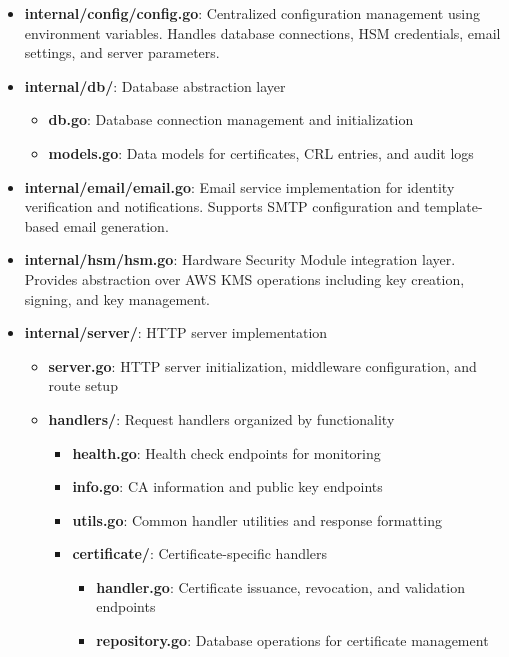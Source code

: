 \begin{itemize}
    \item \textbf{internal/config/config.go}: Centralized configuration management using environment variables. Handles database connections, HSM credentials, email settings, and server parameters.
    
    \item \textbf{internal/db/}: Database abstraction layer
    \begin{itemize}
        \item \textbf{db.go}: Database connection management and initialization
        \item \textbf{models.go}: Data models for certificates, CRL entries, and audit logs
    \end{itemize}
    
    \item \textbf{internal/email/email.go}: Email service implementation for identity verification and notifications. Supports SMTP configuration and template-based email generation.
    
    \item \textbf{internal/hsm/hsm.go}: Hardware Security Module integration layer. Provides abstraction over AWS KMS operations including key creation, signing, and key management.
    
    \item \textbf{internal/server/}: HTTP server implementation
    \begin{itemize}
        \item \textbf{server.go}: HTTP server initialization, middleware configuration, and route setup
        \item \textbf{handlers/}: Request handlers organized by functionality
        \begin{itemize}
            \item \textbf{health.go}: Health check endpoints for monitoring
            \item \textbf{info.go}: CA information and public key endpoints
            \item \textbf{utils.go}: Common handler utilities and response formatting
            \item \textbf{certificate/}: Certificate-specific handlers
            \begin{itemize}
                \item \textbf{handler.go}: Certificate issuance, revocation, and validation endpoints
                \item \textbf{repository.go}: Database operations for certificate management
            \end{itemize}
        \end{itemize}
    \end{itemize}
\end{itemize}


